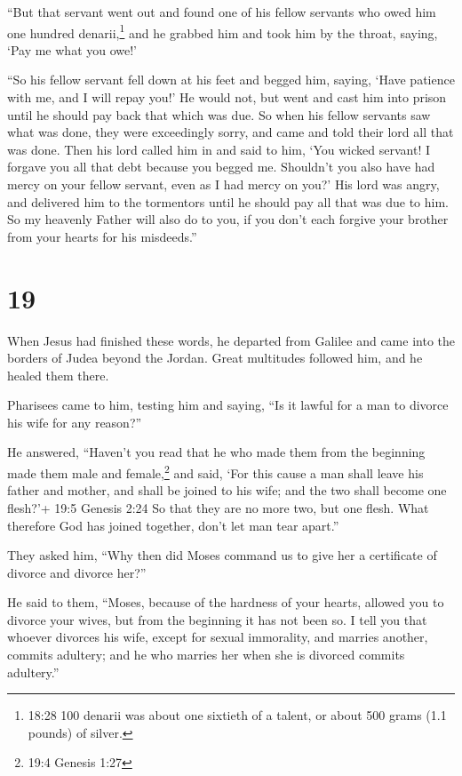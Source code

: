  ``But that servant went out and found one of his fellow
servants who owed him one hundred denarii,\footnote{18:28 100 denarii
  was about one sixtieth of a talent, or about 500 grams (1.1 pounds) of
  silver.} and he grabbed him and took him by the throat, saying, `Pay
me what you owe!'

 ``So his fellow servant fell down at his feet and begged
him, saying, `Have patience with me, and I will repay you!'
 He would not, but went and cast him into prison until he
should pay back that which was due.  So when his fellow
servants saw what was done, they were exceedingly sorry, and came and
told their lord all that was done.  Then his lord called
him in and said to him, `You wicked servant! I forgave you all that debt
because you begged me.  Shouldn't you also have had mercy
on your fellow servant, even as I had mercy on you?'  His
lord was angry, and delivered him to the tormentors until he should pay
all that was due to him.  So my heavenly Father will also
do to you, if you don't each forgive your brother from your hearts for
his misdeeds.''

\hypertarget{section-18}{%
\section{19}\label{section-18}}

 When Jesus had finished these words, he departed from
Galilee and came into the borders of Judea beyond the Jordan.
 Great multitudes followed him, and he healed them there.

 Pharisees came to him, testing him and saying, ``Is it
lawful for a man to divorce his wife for any reason?''

 He answered, ``Haven't you read that he who made them from
the beginning made them male and female,\footnote{19:4 Genesis 1:27}
 and said, `For this cause a man shall leave his father and
mother, and shall be joined to his wife; and the two shall become one
flesh?'+ 19:5 Genesis 2:24  So that they are no more two,
but one flesh. What therefore God has joined together, don't let man
tear apart.''

 They asked him, ``Why then did Moses command us to give her
a certificate of divorce and divorce her?''

 He said to them, ``Moses, because of the hardness of your
hearts, allowed you to divorce your wives, but from the beginning it has
not been so.  I tell you that whoever divorces his wife,
except for sexual immorality, and marries another, commits adultery; and
he who marries her when she is divorced commits adultery.''


